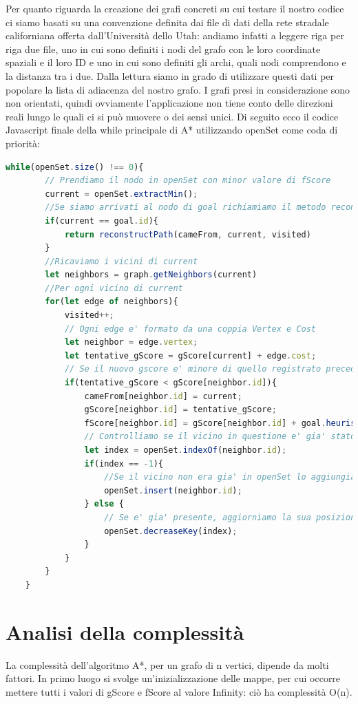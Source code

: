 \documentclass[12pt,a4paper]{report}
\begin{document}
Per quanto riguarda la creazione dei grafi concreti su cui testare il nostro codice ci siamo basati su una convenzione definita dai file di dati della rete stradale californiana offerta dall'Università dello Utah: andiamo infatti a leggere riga per riga due file, uno in cui sono definiti i nodi del grafo con le loro coordinate spaziali e il loro ID e uno in cui sono definiti gli archi, quali nodi comprendono e la distanza tra i due. Dalla lettura siamo in grado di utilizzare questi dati per popolare la lista di adiacenza del nostro grafo. I grafi presi in considerazione sono non orientati, quindi ovviamente l'applicazione non tiene conto delle direzioni reali lungo le quali ci si può muovere o dei sensi unici.
\newpage
Di seguito ecco il codice Javascript finale della while principale di A* utilizzando openSet come coda di priorità:
\\
\begin{lstlisting}[language=JavaScript]
	while(openSet.size() !== 0){
		// Prendiamo il nodo in openSet con minor valore di fScore
		current = openSet.extractMin();
		//Se siamo arrivati al nodo di goal richiamiamo il metodo reconstructPath
		if(current == goal.id){
			return reconstructPath(cameFrom, current, visited)
		} 
		//Ricaviamo i vicini di current
		let neighbors = graph.getNeighbors(current)
		//Per ogni vicino di current 
		for(let edge of neighbors){
			visited++;
			// Ogni edge e' formato da una coppia Vertex e Cost
			let neighbor = edge.vertex;
			let tentative_gScore = gScore[current] + edge.cost;
			// Se il nuovo gscore e' minore di quello registrato precedentemente, aggiorniamo i valori relativi
			if(tentative_gScore < gScore[neighbor.id]){
				cameFrom[neighbor.id] = current;
				gScore[neighbor.id] = tentative_gScore;
				fScore[neighbor.id] = gScore[neighbor.id] + goal.heuristic(neighbor);
				// Controlliamo se il vicino in questione e' gia' stato inserito in openSet
				let index = openSet.indexOf(neighbor.id);
				if(index == -1){
					//Se il vicino non era gia' in openSet lo aggiungiamo
					openSet.insert(neighbor.id);
				} else {
					// Se e' gia' presente, aggiorniamo la sua posizione nella coda
					openSet.decreaseKey(index);
				}
			}
		}
	}
\end{lstlisting}

\chapter{Analisi della complessità}

La complessità dell'algoritmo A*, per un grafo di n vertici, dipende da molti fattori.
In primo luogo si svolge un'inizializzazione delle mappe, per cui occorre mettere tutti i valori di gScore e fScore al valore Infinity: ciò ha complessità O(n).
\end{document}
